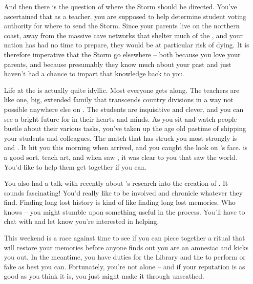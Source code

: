 \documentclass[char]{GL2020}
\begin{document}
And then there is the question of where the Storm should be directed. You've ascertained that as a teacher, you are supposed to help determine student voting authority for where to send the Storm. Since your parents live on the northern coast, away from the massive cave networks that shelter much of the \pTech{}, and your nation has had no time to prepare, they would be at particular risk of dying. It is therefore imperative that the Storm go elsewhere -- both because you love your parents, and because presumably they know much about your past and just haven't had a chance to impart that knowledge back to you.

Life at the \pSchool{} is actually quite idyllic. Most everyone gets along. The teachers are like one, big, extended family that transcends country divisions in a way not possible anywhere else on \pEarth{}. The students are inquisitive and clever, and you can see a bright future for \pEarth{} in their hearts and minds. As you sit and watch people bustle about their various tasks, you've taken up the age old pastime of shipping your students and colleagues. The match that has struck you most strongly is \cHeadScientist{\full} and \cChupAvenger{\full}. It hit you this morning when \cHeadScientist{} arrived, and you caught the look on \cChupAvenger{}'s face. \cChupAvenger{} is a good sort. \cChupAvenger{\They} teach\cChupAvenger{\plural} art, and when \cChupAvenger{\they} saw \cHeadScientist{}, it was clear to you that \cChupAvenger{\they} saw the world. You'd like to help them get together if you can.

You also had a talk with \cBeetle{\full} recently about \cEbbPriest{\full}'s research into the creation of \pEarth{}. It sounds fascinating! You'd really like to be involved and chronicle whatever they find. Finding long lost history is kind of like finding long lost memories. Who knows – you might stumble upon something useful in the process. You'll have to chat with \cEbbPriest{} and let \cEbbPriest{\them} know you're interested in helping.

This weekend is a race against time to see if you can piece together a ritual that will restore your memories before anyone finds out you are an amnesiac and kicks you out. In the meantime, you have duties for the Library and the \pSc{} to perform or fake as best you can. Fortunately, you're not alone -- and if your reputation is as good as you think it is, you just might make it through unscathed.
\end{document}
